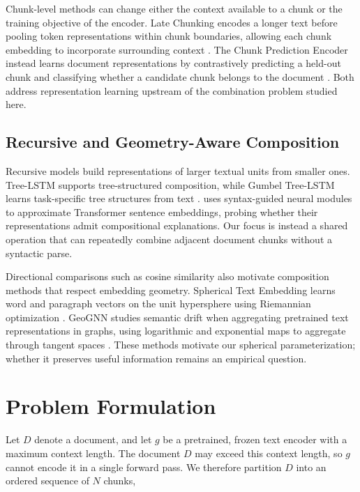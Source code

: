 \documentclass[10pt]{article}
\begin{document}
Chunk-level methods can change either the context available to a chunk or the
training objective of the encoder. Late Chunking encodes a longer text before
pooling token representations within chunk boundaries, allowing each chunk
embedding to incorporate surrounding context
\citep{gunther-etal-2024-late-chunking}. The Chunk Prediction Encoder instead
learns document representations by contrastively predicting a held-out chunk
and classifying whether a candidate chunk belongs to the document
\citep{abro-etal-2026-learning}. Both address representation learning upstream
of the combination problem studied here.

\subsection{Recursive and Geometry-Aware Composition}

Recursive models build representations of larger textual units from smaller
ones. Tree-LSTM supports tree-structured composition, while Gumbel Tree-LSTM
learns task-specific tree structures from text
\citep{socher-etal-2013-recursive,tai-etal-2015-improved,choi-etal-2018-learning}.
\citet{pandey-2023-syntax} uses syntax-guided neural modules to approximate Transformer sentence
embeddings, probing whether their representations admit compositional
explanations. Our focus is instead a shared operation
that can repeatedly combine adjacent document chunks without a syntactic parse.

Directional comparisons such as cosine similarity also motivate composition
methods that respect embedding geometry. Spherical Text Embedding learns word
and paragraph vectors on the unit hypersphere using Riemannian optimization
\citep{meng-etal-2019-spherical}. GeoGNN studies semantic drift when aggregating
pretrained text representations in graphs, using logarithmic and exponential
maps to aggregate through tangent spaces \citep{yang-etal-2025-geognn}.
These methods motivate our spherical parameterization; whether it preserves
useful information remains an empirical question.

\section{Problem Formulation}
\label{sec:problem}

Let \(D\) denote a document, and let \(g\) be a pretrained, frozen text encoder with a maximum context length. The document \(D\) may exceed this context length, so \(g\) cannot encode it in a single forward pass. We therefore partition \(D\) into an ordered sequence of \(N\) chunks,
\end{document}
